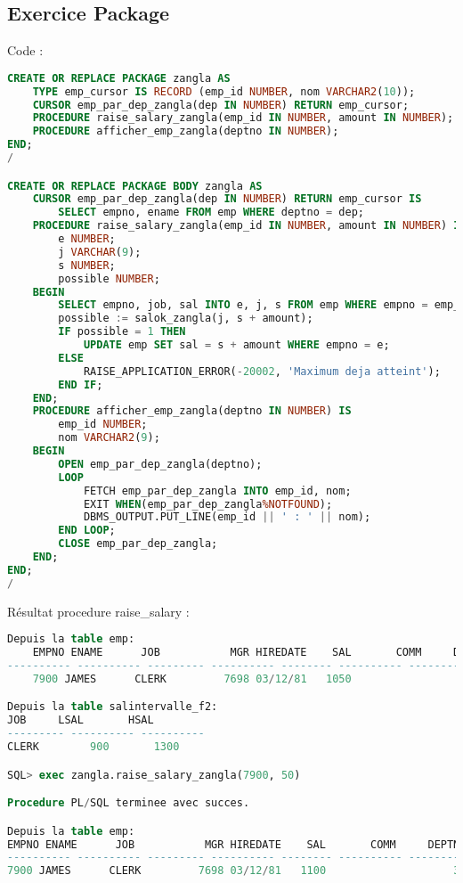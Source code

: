 \documentclass{article}
\begin{document}
\subsection{Exercice Package}
Code :
\begin{lstlisting}[language=SQL,
    deletekeywords={char},
    morekeywords={DECLARE, LOOP, TYPE, FOR, IF, IS, OPEN, FETCH, DBMS_OUTPUT, PUT_LINE}]
CREATE OR REPLACE PACKAGE zangla AS
	TYPE emp_cursor IS RECORD (emp_id NUMBER, nom VARCHAR2(10));
	CURSOR emp_par_dep_zangla(dep IN NUMBER) RETURN emp_cursor;
	PROCEDURE raise_salary_zangla(emp_id IN NUMBER, amount IN NUMBER);
	PROCEDURE afficher_emp_zangla(deptno IN NUMBER);
END;
/

CREATE OR REPLACE PACKAGE BODY zangla AS
	CURSOR emp_par_dep_zangla(dep IN NUMBER) RETURN emp_cursor IS 
		SELECT empno, ename FROM emp WHERE deptno = dep;
	PROCEDURE raise_salary_zangla(emp_id IN NUMBER, amount IN NUMBER) IS
		e NUMBER;
		j VARCHAR(9);
		s NUMBER;
		possible NUMBER;
	BEGIN
		SELECT empno, job, sal INTO e, j, s FROM emp WHERE empno = emp_id;
		possible := salok_zangla(j, s + amount);
		IF possible = 1 THEN 
			UPDATE emp SET sal = s + amount WHERE empno = e;
		ELSE
			RAISE_APPLICATION_ERROR(-20002, 'Maximum deja atteint');
		END IF;
	END;
	PROCEDURE afficher_emp_zangla(deptno IN NUMBER) IS
		emp_id NUMBER;
		nom VARCHAR2(9);
	BEGIN
		OPEN emp_par_dep_zangla(deptno);
		LOOP
			FETCH emp_par_dep_zangla INTO emp_id, nom;
			EXIT WHEN(emp_par_dep_zangla%NOTFOUND);
			DBMS_OUTPUT.PUT_LINE(emp_id || ' : ' || nom);
		END LOOP;
		CLOSE emp_par_dep_zangla;
	END;
END;
/


\end{lstlisting}

Résultat procedure raise\_salary :
\begin{lstlisting}[language=SQL,
    morekeywords={DECLARE, LOOP, TYPE, FOR, IF, IS, OPEN, FETCH, DBMS_OUTPUT, PUT_LINE}]
Depuis la table emp:
    EMPNO ENAME      JOB	       MGR HIREDATE	   SAL	     COMM     DEPTNO
---------- ---------- --------- ---------- -------- ---------- ---------- ----------
    7900 JAMES      CLERK	      7698 03/12/81	  1050			           30

Depuis la table salintervalle_f2:
JOB		LSAL	   HSAL
--------- ---------- ----------
CLERK		 900	   1300

SQL> exec zangla.raise_salary_zangla(7900, 50)

Procedure PL/SQL terminee avec succes.

Depuis la table emp:
EMPNO ENAME      JOB	       MGR HIREDATE	   SAL	     COMM     DEPTNO
---------- ---------- --------- ---------- -------- ---------- ---------- ----------
7900 JAMES      CLERK	      7698 03/12/81	  1100			          30
\end{lstlisting}
\end{document}

